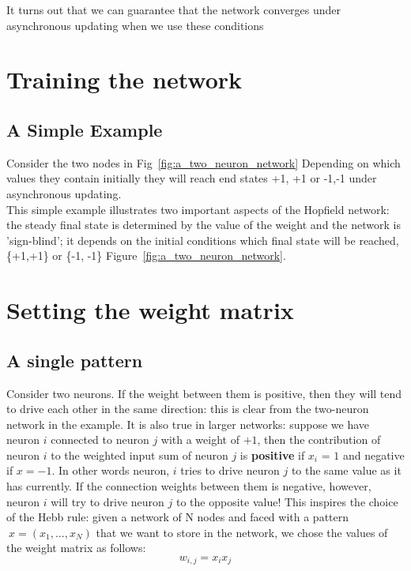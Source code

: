 \documentclass[12pt, right open]{memoir}
\begin{document}
It turns out that we can guarantee that the network converges under asynchronous
updating when we use these conditions

\section{Training the network}
\subsection{A Simple Example}

Consider the two nodes in Fig~\ref{fig:a_two_neuron_network} Depending on which values they contain initially they will reach end states {+1, +1} or {-1,-1} under asynchronous
updating. \\
This simple example illustrates two important aspects of the Hopfield network:
the steady final state is determined by the value of the weight and the
network is ’sign-blind’; it depends on the initial conditions which final state will
be reached, \{+1,+1\} or \{-1, -1\} Figure~\ref{fig:a_two_neuron_network}.

\section{Setting the weight matrix}
\subsection{A single pattern}
Consider two neurons. If the weight between them is positive, then they will
tend to drive each other in the same direction: this is clear from the two-neuron
network in the example. It is also true in larger networks: suppose we have
neuron $i$ connected to neuron $j$ with a weight of $+1$, then the contribution of
neuron $i$ to the weighted input sum of neuron $j$ is \textbf{positive} if $x_i$ = $1$ and negative if $x = -1$. In other words neuron, $i$ tries to drive neuron $j$ to the same value as it has currently. If the connection weights between them is negative, however,
neuron $i$ will try to drive neuron $j$ to the opposite value! This inspires the
choice of the Hebb rule: given a network of N nodes and faced with a pattern
$~x = (x_1, ..., x_N )$ that we want to store in the network, we chose the values of
the weight matrix as follows:
\[ 
 w_{i,j} = x_ix_j
\]
\end{document}
